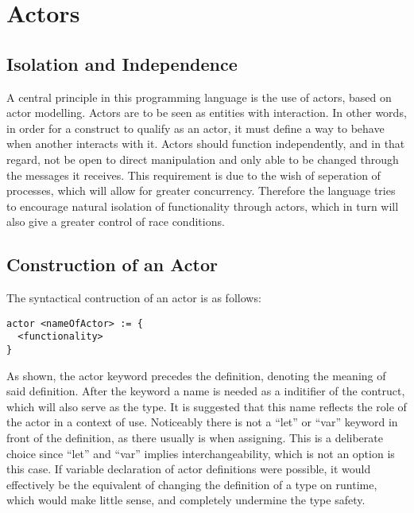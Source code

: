 \section{Actors}





\subsection{Isolation and Independence}

A central principle in this programming language is the use of actors, based on actor modelling. Actors are to be seen as entities with interaction. In other words, in order for a construct to qualify as an actor, it must define a way to behave when another interacts with it. Actors should function independently, and in that regard, not be open to direct manipulation and only able to be changed through the messages it receives. This requirement is due to the wish of seperation of processes, which will allow for greater concurrency. Therefore the language tries to encourage natural isolation of functionality through actors, which in turn will also give a greater control of race conditions.

\subsection{Construction of an Actor}

The syntactical contruction of an actor is as follows:

\begin{lstlisting}
actor <nameOfActor> := {
  <functionality>
}
\end{lstlisting}

As shown, the actor keyword precedes the definition, denoting the meaning of said definition. After the keyword a name is needed as a inditifier of the contruct, which will also serve as the type. It is suggested that this name reflects the role of the actor in a context of use. Noticeably there is not a \enquote{let} or \enquote{var} keyword in front of the definition, as there usually is when assigning. This is a deliberate choice since \enquote{let} and \enquote{var} implies interchangeability, which is not an option is this case. If variable declaration of actor definitions were possible, it would effectively be the equivalent of changing the definition of a type on runtime, which would make little sense, and completely undermine the type safety.

